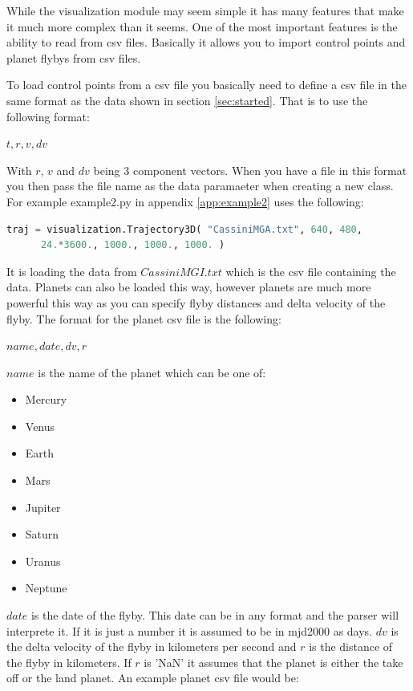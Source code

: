 \documentclass[a4paper,11pt]{article}
\begin{document}
While the visualization module may seem simple it has many features that make it much more complex than it seems. One of the most important features is the ability to read from \gls{csv} files. Basically it allows you to import control points and planet flybys from \gls{csv} files.

To load control points from a \gls{csv} file you basically need to define a \gls{csv} file in the same format as the data shown in section \ref{sec:started}. That is to use the following format:

$ t, r, v, dv $

With $r$, $v$ and $dv$ being 3 component vectors. When you have a file in this format you then pass the file name as the data paramaeter when creating a new class. For example example2.py in appendix \ref{app:example2} uses the following:

\begin{lstlisting}[language=Python]
traj = visualization.Trajectory3D( "CassiniMGA.txt", 640, 480,
      24.*3600., 1000., 1000., 1000. )
\end{lstlisting}

It is loading the data from $CassiniMGI.txt$ which is the \gls{csv} file containing the data. Planets can also be loaded this way, however planets are much more powerful this way as you can specify flyby distances and delta velocity of the flyby. The format for the planet \gls{csv} file is the following:

$ name, date, dv, r $

$name$ is the name of the planet which can be one of:

\begin{itemize}
\item Mercury
\item Venus
\item Earth
\item Mars
\item Jupiter
\item Saturn
\item Uranus
\item Neptune
\end{itemize}

$date$ is the date of the flyby. This date can be in any format and the parser will interprete it. If it is just a number it is assumed to be in \gls{mjd2000} as days. $dv$ is the delta velocity of the flyby in kilometers per second and $r$ is the distance of the flyby in kilometers. If $r$ is 'NaN' it assumes that the planet is either the take off or the land planet. An example planet \gls{csv} file would be:
\end{document}
